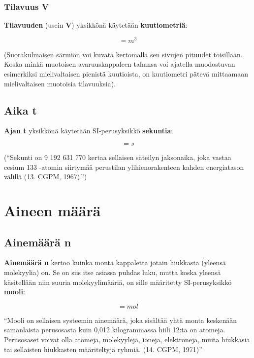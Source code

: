 \documentclass[12pt,a4paper,finnish]{book}
\begin{document}
\subsubsection{Tilavuus V}

\textbf{Tilavuuden} (usein \textbf{V}) yksikkönä käytetään \textbf{kuutiometriä}:

\begin{equation}
 [V] = m^3
\end{equation}

(Suorakulmaisen särmiön voi kuvata kertomalla sen sivujen pituudet toisillaan. Koska minkä muotoisen avaruuskappaleen 
tahansa voi ajatella muodostuvan esimerkiksi mielivaltaisen pienistä kuutioista, on kuutiometri pätevä mittaamaan 
mielivaltaisen muotoisia tilavuuksia).

\subsection{Aika t}

\textbf{Ajan t} yksikkönä käytetään SI-perusyksikkö \textbf{sekuntia}:

\begin{equation}
 [t] = s
\end{equation}

(``Sekunti on 9 192 631 770 kertaa sellaisen säteilyn jaksonaika, joka vastaa cesium 133 -atomin siirtymää 
perustilan ylihienorakenteen kahden energiatason välillä (13. CGPM, 1967).'')


\section{Aineen määrä} %

\subsection{Ainemäärä n}

\textbf{Ainemäärä n} kertoo kuinka monta kappaletta jotain hiukkasta (yleensä molekyylia) on. Se on siis itse 
asiassa puhdas luku, mutta koska yleensä käsitellään niin suuria molekyylimääriä, on sille määritetty 
SI-perusyksikkö \textbf{mooli}:

\begin{equation}
 [n] = mol
\end{equation}

``Mooli on sellaisen systeemin ainemäärä, joka sisältää yhtä monta keskenään samanlaista perusosasta kuin 0,012 
kilogrammassa hiili 12:ta on atomeja. Perusosaset voivat olla atomeja, molekyylejä, ioneja, elektroneja,
muita hiukkasia tai sellaisten hiukkasten määriteltyjä ryhmiä. (14. CGPM, 1971)''
\end{document}
